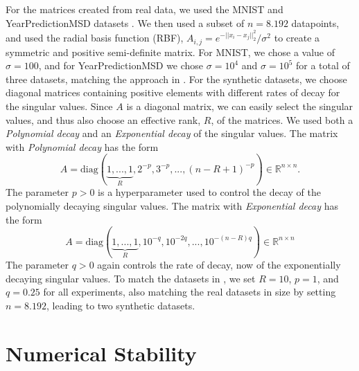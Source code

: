 \documentclass{article}
\theoremstyle{definition}
\begin{document}
For the matrices created from real data, we used the MNIST and YearPredictionMSD datasets \cite{726791, Bertin-Mahieux2011}. We then used a subset of $n=8.192$ datapoints, and used the radial basis function (RBF), $A_{i,j}=e^{-||x_i-x_j||_2^2}/{\sigma^2}$ to create a symmetric and positive semi-definite matrix. For MNIST, we chose a value of $\sigma=100$, and for YearPredictionMSD we chose $\sigma=10^4$ and $\sigma=10^5$ for a total of three datasets, matching the approach in \cite{balabanov2022}. \newline
For the synthetic datasets, we choose diagonal matrices containing positive elements with different rates of decay for the singular values. Since $A$ is a diagonal matrix, we can easily select the singular values, and thus also choose an effective rank, $R$, of the matrices. We used both a \textit{Polynomial decay} and an \textit{Exponential decay} of the singular values. The matrix with \textit{Polynomial decay} has the form
\begin{equation*}
A=\text{diag}(\underbrace{1,...,1}_R,2^{-p}, 3^{-p}, ..., (n-R+1)^{-p})\in\mathbb{R}^{n\times n}.
\end{equation*}
The parameter $p>0$ is a hyperparameter used to control the decay of the polynomially decaying singular values. The matrix with \textit{Exponential decay} has the form
\begin{equation*}
A=\text{diag}(\underbrace{1,...,1}_R,10^{-q}, 10^{-2q}, ..., 10^{-(n-R)q})\in\mathbb{R}^{n\times n}
\end{equation*}
The parameter $q>0$ again controls the rate of decay, now of the exponentially decaying singular values. To match the datasets in \cite{tropp2017fixedrank}, we set $R=10$, $p=1$, and $q=0.25$ for all experiments, also matching the real datasets in size by setting $n=8.192$, leading to two synthetic datasets.

\section{Numerical Stability} \label{sec:num_stability}
\end{document}
